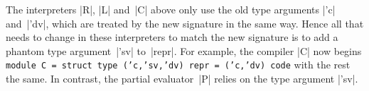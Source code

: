\begin{comment}
\begin{figure}
\begin{floatrule}
\begin{code}
module P = struct
  type ('c,'sv,'dv) repr = {st: 'sv option; dy: ('c,'dv) code}
  let abstr {dy = x} = x
  let pdyn x = {st = None; dy = x}

  let int  (x:int)  = {st = Some (R.int x);  dy = C.int x}
  let bool (x:bool) = {st = Some (R.bool x); dy = C.bool x}

  let add e1 e2 = match e1, e2 with
  | {st = Some 0}, e | e, {st = Some 0} -> e
  | {st = Some m}, {st = Some n} -> int (R.add m n)
  | _ -> pdyn (C.add (abstr e1) (abstr e2))

  let if_ eb et ee = match eb with
  | {st = Some b} -> if b then et () else ee ()
  | _ -> pdyn (C.if_ (abstr eb) (fun () -> abstr (et ()))
                                (fun () -> abstr (ee ())))
  let lam f = {st = Some f; 
               dy = C.lam (fun x -> abstr (f (pdyn x)))}

  let app ef ea = match ef with
  | {st = Some f} -> f ea
  | _ -> pdyn (C.app (abstr ef) (abstr ea))

  let fix f = 
    let fdyn = C.fix (fun x -> abstr (f (pdyn x)))
    in let rec self = function
       | {st = Some _} as e -> app (f (lam self)) e
       | e -> pdyn (C.app fdyn (abstr e))
       in {st = Some self; dy = fdyn}
end
\end{code}
\end{floatrule}
\caption{Our partial evaluator (\texttt{mul} and \texttt{leq} are elided)}
\label{fig:pe}
\end{figure}
\end{comment}

The interpreters |R|, |L| and~|C| above only use the old
type arguments |'c| and~|'dv|, which are treated by the new signature
in the same way.  Hence all that needs to change in these interpreters
to match the new signature is to add a phantom type
argument~|'sv| to~|repr|.
For example, the compiler |C| now begins \texttt{module C = struct
  type ('c,'sv,'dv) repr = ('c,'dv) code} with the rest the same.
In contrast, the partial evaluator~|P| relies on the type argument |'sv|.

\begin{comment}
For example, the compiler |C| now begins
\begin{code}
module C = struct
  type ('c,'sv,'dv) repr = ('c,'dv) code
  (* the rest is the same *)
\end{code}
In contrast, the partial evaluator~|P| relies on the type argument |'sv|.
\end{comment}

